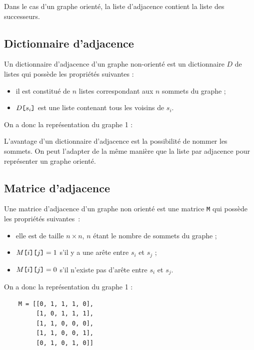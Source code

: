 
Dans le cas d'un graphe orienté, la liste d'adjacence contient la liste des successeurs.

\subsection{Dictionnaire d'adjacence}

Un dictionnaire d'adjacence d'un graphe non-orienté est un dictionnaire $D$ de listes qui possède les propriétés suivantes :
\begin{itemize}
	\item il est constitué de $n$ listes correspondant aux $n$ sommets du graphe ;
	\item $D\verb![!s_i\verb!]!$ est une liste contenant tous les voisins de $s_i$. 
\end{itemize}

On a donc la représentation du graphe 1 :


L'avantage d'un dictionnaire d'adjacence est la possibilité de nommer les sommets. On peut l'adapter de la même manière que la liste par adjacence pour représenter un graphe orienté. 

\subsection{Matrice d'adjacence}

Une matrice d'adjacence d'un graphe non orienté est une matrice \texttt{M} qui possède les propriétés suivantes~:
\begin{itemize}
	\item elle est de taille $n \times n$, $n$ étant le nombre de sommets du graphe ;
	\item $M\verb![!i\verb!]!\verb![!j\verb!]!=1$ s'il y a une arête entre $s_i$ et  $s_j$ ; 
	\item $M\verb![!i\verb!]!\verb![!j\verb!]!=0$ s'il n'existe pas d'arête entre $s_i$ et $s_j$.
\end{itemize}

On a donc la représentation du graphe 1 :


\begin{Verbatim}
    M = [[0, 1, 1, 1, 0],
         [1, 0, 1, 1, 1],
         [1, 1, 0, 0, 0],
         [1, 1, 0, 0, 1],
         [0, 1, 0, 1, 0]]
\end{Verbatim}


